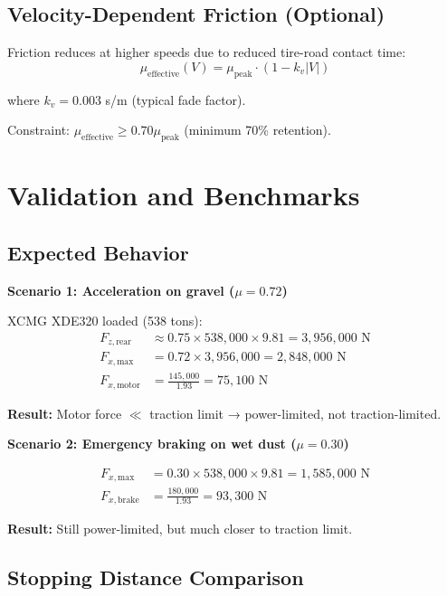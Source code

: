 \documentclass[11pt,a4paper]{article}
\begin{document}
\subsection{Velocity-Dependent Friction (Optional)}

Friction reduces at higher speeds due to reduced tire-road contact time:
\begin{equation}
\mu_{\text{effective}}(V) = \mu_{\text{peak}} \cdot \left(1 - k_v |V|\right)
\end{equation}

where $k_v = 0.003$ s/m (typical fade factor).

Constraint: $\mu_{\text{effective}} \geq 0.70 \mu_{\text{peak}}$ (minimum 70\% retention).

\section{Validation and Benchmarks}

\subsection{Expected Behavior}

\textbf{Scenario 1: Acceleration on gravel ($\mu = 0.72$)}

XCMG XDE320 loaded (538 tons):
\begin{align}
F_{z,\text{rear}} &\approx 0.75 \times 538{,}000 \times 9.81 = 3{,}956{,}000 \text{ N} \\
F_{x,\text{max}} &= 0.72 \times 3{,}956{,}000 = 2{,}848{,}000 \text{ N} \\
F_{x,\text{motor}} &= \frac{145{,}000}{1.93} = 75{,}100 \text{ N}
\end{align}

\textbf{Result:} Motor force $\ll$ traction limit → power-limited, not traction-limited.

\textbf{Scenario 2: Emergency braking on wet dust ($\mu = 0.30$)}

\begin{align}
F_{x,\text{max}} &= 0.30 \times 538{,}000 \times 9.81 = 1{,}585{,}000 \text{ N} \\
F_{x,\text{brake}} &= \frac{180{,}000}{1.93} = 93{,}300 \text{ N}
\end{align}

\textbf{Result:} Still power-limited, but much closer to traction limit.

\subsection{Stopping Distance Comparison}
\end{document}
